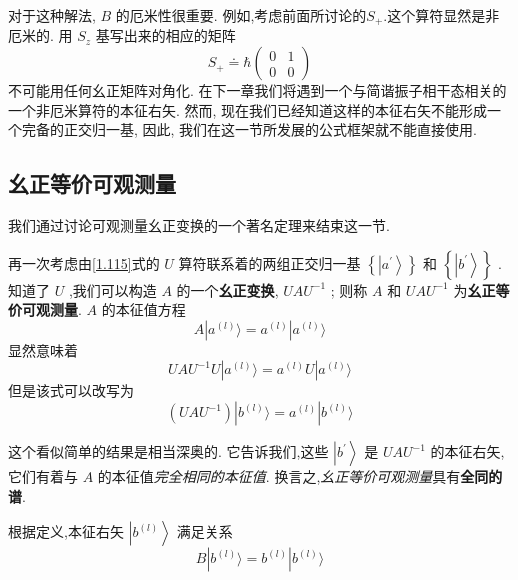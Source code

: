 	对于这种解法, $B$ 的厄米性很重要. 例如,考虑前面所讨论的${S}_{+}$.这个算符显然是非厄米的. 用 ${S}_{z}$ 基写出来的相应的矩阵
	\begin{equation}
		{S}_{ + } \doteq \hbar \left( \begin{array}{ll} 0 & 1 \\ 0 & 0 \end{array}\right)
	\end{equation}
	不可能用任何幺正矩阵对角化. 在下一章我们将遇到一个与简谐振子相干态相关的一个非厄米算符的本征右矢. 然而, 现在我们已经知道这样的本征右矢不能形成一个完备的正交归一基, 因此, 我们在这一节所发展的公式框架就不能直接使用.
	\subsection{幺正等价可观测量}
	我们通过讨论可观测量幺正变换的一个著名定理来结束这一节.
	\begin{theorem}\label{thm:1.4} 
		再一次考虑由\ref{1.115}式的 $U$ 算符联系着的两组正交归一基 $\left\{ \left| {a}^{\prime }\right\rangle \right\}$ 和 $\left\{ \left| {b}^{\prime }\right\rangle \right\}$ . 知道了 $U$ ,我们可以构造 $A$ 的一个\textbf{幺正变换}, ${UA}{U}^{-1}$ ; 则称 $A$ 和 ${UA}{U}^{-1}$ 为\textbf{幺正等价可观测量}. $A$ 的本征值方程
		\begin{equation}
			A| {a}^{\left( l\right) }\rangle = {a}^{\left( l\right) }| {a}^{\left( l\right) }\rangle
		\end{equation}
		显然意味着
		\begin{equation}
			{UA}{U}^{-1}U| {a}^{\left( l\right) }\rangle = {a}^{\left( l\right) }U| {a}^{\left( l\right) }\rangle
		\end{equation}
		但是该式可以改写为
		\begin{equation}
			( {{UA}{U}^{-1}}) | {b}^{\left( l\right) }\rangle = {a}^{\left( l\right) }| {b}^{\left( l\right) }\rangle
		\end{equation}
	\end{theorem}
	
	这个看似简单的结果是相当深奥的. 它告诉我们,这些 $\left| {b}^{\prime }\right\rangle$ 是 ${UA}{U}^{-1}$ 的本征右矢, 它们有着与 $A$ 的本征值\textit{完全相同的本征值}. 换言之,\textit{幺正等价可观测量}具有\textbf{全同的谱}.
	
	根据定义,本征右矢 $\left| {b}^{\left( l\right) }\right\rangle$ 满足关系
	\begin{equation}
		B| {b}^{\left( l\right) }\rangle = {b}^{\left( l\right) }| {b}^{\left( l\right) }\rangle
	\end{equation}
	
